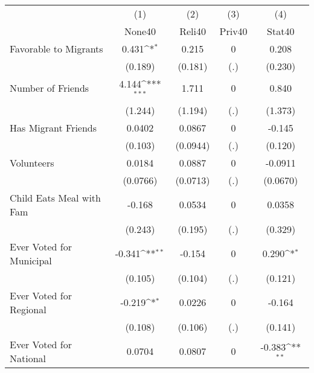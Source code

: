 {
\def\sym#1{\ifmmode^{#1}\else\(^{#1}\)\fi}
\begin{tabular}{l*{4}{c}}
\hline\hline
            &\multicolumn{1}{c}{(1)}&\multicolumn{1}{c}{(2)}&\multicolumn{1}{c}{(3)}&\multicolumn{1}{c}{(4)}\\
            &\multicolumn{1}{c}{None40}&\multicolumn{1}{c}{Reli40}&\multicolumn{1}{c}{Priv40}&\multicolumn{1}{c}{Stat40}\\
\hline
Favorable to Migrants&       0.431\sym{*}  &       0.215         &           0         &       0.208         \\
            &     (0.189)         &     (0.181)         &         (.)         &     (0.230)         \\
[1em]
Number of Friends&       4.144\sym{***}&       1.711         &           0         &       0.840         \\
            &     (1.244)         &     (1.194)         &         (.)         &     (1.373)         \\
[1em]
Has Migrant Friends&      0.0402         &      0.0867         &           0         &      -0.145         \\
            &     (0.103)         &    (0.0944)         &         (.)         &     (0.120)         \\
[1em]
Volunteers  &      0.0184         &      0.0887         &           0         &     -0.0911         \\
            &    (0.0766)         &    (0.0713)         &         (.)         &    (0.0670)         \\
[1em]
Child Eats Meal with Fam&      -0.168         &      0.0534         &           0         &      0.0358         \\
            &     (0.243)         &     (0.195)         &         (.)         &     (0.329)         \\
[1em]
Ever Voted for Municipal&      -0.341\sym{**} &      -0.154         &           0         &       0.290\sym{*}  \\
            &     (0.105)         &     (0.104)         &         (.)         &     (0.121)         \\
[1em]
Ever Voted for Regional&      -0.219\sym{*}  &      0.0226         &           0         &      -0.164         \\
            &     (0.108)         &     (0.106)         &         (.)         &     (0.141)         \\
[1em]
Ever Voted for National&      0.0704         &      0.0807         &           0         &      -0.383\sym{**} \\

\end{tabular}}
